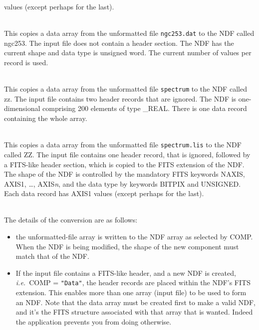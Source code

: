 \documentclass[twoside,11pt]{article}
\newlength{\sstexampleslength}
\newcommand{\sstexamplesubsection}[2]{\sloppy
\item[\parbox{\sstexampleslength}{\ssttt #1}] \mbox{} \vspace{0.5ex}
\\ #2 \vspace{1.0ex}}
\newcommand{\sstnotes}[1]{\pagebreak[3] \item[Notes:] \mbox{} \\[1.3ex] #1}
\newcommand{\ssthitemlist}[1]{
  \latexonly{
  \mbox{} \\
  \vspace{-3.5ex}
  }
  \begin{itemize}
     #1
  \end{itemize}
}
\newcommand{\sstitem}{\item}
\newcommand{\sstexamplesubsection}[2]{
   \vspace{-1.0ex} \item[{\ssttt #1}] #2 \vspace{0.2ex}}
\newcommand{\sstnotes}[1]{\item[Notes:]
      \begin{description}
         #1
      \end{description}
   }
\newcommand{\sstitem}{\item}
\begin{document}
{{{         values (except perhaps for the last).
      }
      \sstexamplesubsection{
         unf2ndf type="\_uword" in=ngc253.dat out=ngc253 $\backslash$
      }{
         This copies a data array from the unformatted file \texttt{ngc253.dat}
         to the NDF called ngc253.  The input file does not contain a
         header section.  The NDF has the current shape and data type
         is unsigned word.  The current number of values per record is
         used.
      }
      \sstexamplesubsection{
         unf2ndf spectrum zz skip=2 shape=200 noperec=!
      }{
         This copies a data array from the unformatted file \texttt{spectrum}
         to the NDF called zz.  The input file contains two header
         records that are ignored.  The NDF is one-dimensional
         comprising 200 elements of type \_REAL.  There is one data
         record containing the whole array.
      }
      \sstexamplesubsection{
         unf2ndf spectrum.lis ZZ skip=1 fits noperec=20
      }{
         This copies a data array from the unformatted file 
         \texttt{spectrum.lis}
         to the NDF called ZZ.  The input file contains one header
         record, that is ignored, followed by a FITS-like header
         section, which is copied to the FITS extension of the NDF.
         The shape of the NDF is controlled by the mandatory FITS
         keywords NAXIS, AXIS1, \ldots, AXIS{\em{n}}, and the data type by
         keywords BITPIX and UNSIGNED.  Each data record has AXIS1
         values (except perhaps for the last).
      }
   }
   \sstnotes{
      The details of the conversion are as follows:
      \ssthitemlist{

         \sstitem
            the unformatted-file array is written to the NDF array as
            selected by COMP.  When the NDF is being modified, the shape
            of the new component must match that of the NDF.

         \sstitem
            If the input file contains a FITS-like header, and a new
            NDF is created, {\it i.e.}\ COMP = \texttt{"Data"}, the header
            records are placed within the NDF's FITS extension.  This enables 
            more than one array (input file) to be used to form an NDF.  Note
            that the data array must be created first to make a valid NDF,
            and it's the FITS structure associated with that array that is
            wanted.  Indeed the application prevents you from doing
            otherwise.

}}}
\end{document}

